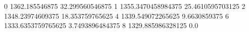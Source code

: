 0 1362.185546875 32.299560546875
1 1355.3470458984375 25.4610595703125
2 1348.23974609375 18.353759765625
4 1339.549072265625 9.6630859375
6 1333.6353759765625 3.7493896484375
8 1329.885986328125 0.0
